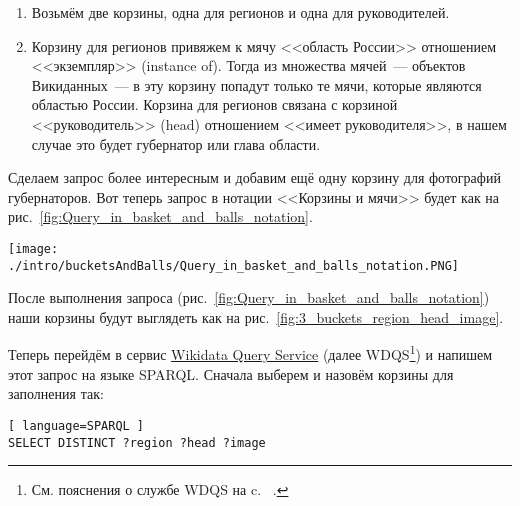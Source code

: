 \begin{enumerate}
    \item Возьмём две корзины, одна для регионов и одна для руководителей.
    \item Корзину для регионов привяжем к мячу <<область России>> отношением <<экземпляр>> (instance of). Тогда из множества мячей~--- объектов Викиданных~--- в эту корзину попадут только те мячи, которые являются областью России. Корзина для регионов связана с корзиной <<руководитель>> (head) отношением <<имеет руководителя>>, в нашем случае это будет губернатор или глава области.
\end{enumerate}

Сделаем запрос более интересным и добавим ещё одну корзину для фотографий губернаторов. Вот теперь запрос в нотации <<Корзины и мячи>> будет как на рис.~\ref{fig:Query_in_basket_and_balls_notation}.

\begin{figure*}[h!]
    \texttt{[image: ./intro/bucketsAndBalls/Query\_in\_basket\_and\_balls\_notation.PNG]}
    \caption{Запрос в нотации <<Корзины и мячи>> для заполнения корзин <<регион>> мячами <<область России>>, <<руководитель>>~--- губернаторами или главами области, <<изображение>>~--- их фотографиями.}
	\label{fig:Query_in_basket_and_balls_notation}
\end{figure*}

\newpage
После выполнения запроса (рис.~\ref{fig:Query_in_basket_and_balls_notation}) наши корзины будут выглядеть как на рис.~\ref{fig:3_buckets_region_head_image}.

\begin{marginfigure}
	{
		\setlength{\fboxsep}{0pt}%
		\setlength{\fboxrule}{1pt}%
	}
    \caption{Корзины после выполнении запроса на рис.~\ref{fig:Query_in_basket_and_balls_notation}. \textit{?region}~--- это области России, \textit{?head}~--- это руководители, \textit{?image}~--- это фотографии руководства.}
	\label{fig:3_buckets_region_head_image}
\end{marginfigure}

Теперь перейдём в сервис \href{https://query.wikidata.org/}{Wikidata Query Service} (далее WDQS\footnote[][15pt]{См. пояснения о службе WDQS на c. ~\pageref{ch:ReviewAboutWD}.})  и напишем этот запрос на языке SPARQL. Сначала выберем и назовём корзины для заполнения так:

\begin{lstlisting}[ language=SPARQL ]
SELECT DISTINCT ?region ?head ?image
\end{lstlisting}

